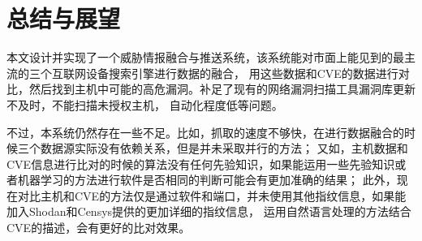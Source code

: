 \chapter{总结与展望}
\label{cha:conclusion}

本文设计并实现了一个威胁情报融合与推送系统，该系统能对市面上能见到的最主流的三个互联网设备搜索引擎进行数据的融合，
用这些数据和CVE的数据进行对比，然后找到主机中可能的高危漏洞。补足了现有的网络漏洞扫描工具漏洞库更新不及时，不能扫描未授权主机，
自动化程度低等问题。

不过，本系统仍然存在一些不足。比如，抓取的速度不够快，在进行数据融合的时候三个数据源实际没有依赖关系，但是并未采取并行的方法；
又如，主机数据和CVE信息进行比对的时候的算法没有任何先验知识，如果能运用一些先验知识或者机器学习的方法进行软件是否相同的判断可能会有更加准确的结果；
此外，现在对比主机和CVE的方法仅是通过软件和端口，并未使用其他指纹信息，如果能加入Shodan和Censys提供的更加详细的指纹信息，
运用自然语言处理的方法结合CVE的描述，会有更好的比对效果。